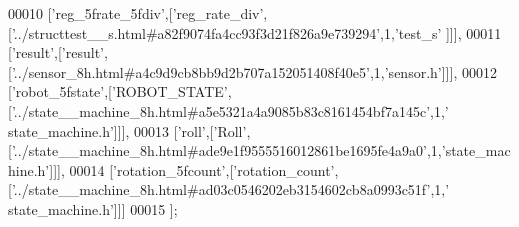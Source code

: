 \begin{DoxyCode}
00010   [\textcolor{stringliteral}{'reg\_5frate\_5fdiv'},[\textcolor{stringliteral}{'reg\_rate\_div'},[\textcolor{stringliteral}{'../structtest\_\_s.html#a82f9074fa4cc93f3d21f826a9e739294'},1,\textcolor{stringliteral}{'test\_s'}
      ]]],
00011   [\textcolor{stringliteral}{'result'},[\textcolor{stringliteral}{'result'},[\textcolor{stringliteral}{'../sensor\_8h.html#a4c9d9cb8bb9d2b707a152051408f40e5'},1,\textcolor{stringliteral}{'sensor.h'}]]],
00012   [\textcolor{stringliteral}{'robot\_5fstate'},[\textcolor{stringliteral}{'ROBOT\_STATE'},[\textcolor{stringliteral}{'../state\_\_machine\_8h.html#a5e5321a4a9085b83c8161454bf7a145c'},1,\textcolor{stringliteral}{'
      state\_machine.h'}]]],
00013   [\textcolor{stringliteral}{'roll'},[\textcolor{stringliteral}{'Roll'},[\textcolor{stringliteral}{'../state\_\_machine\_8h.html#ade9e1f9555516012861be1695fe4a9a0'},1,\textcolor{stringliteral}{'state\_machine.h'}]]],
00014   [\textcolor{stringliteral}{'rotation\_5fcount'},[\textcolor{stringliteral}{'rotation\_count'},[\textcolor{stringliteral}{'../state\_\_machine\_8h.html#ad03c0546202eb3154602cb8a0993c51f'},1,\textcolor{stringliteral}{'
      state\_machine.h'}]]]
00015 ];
\end{DoxyCode}
